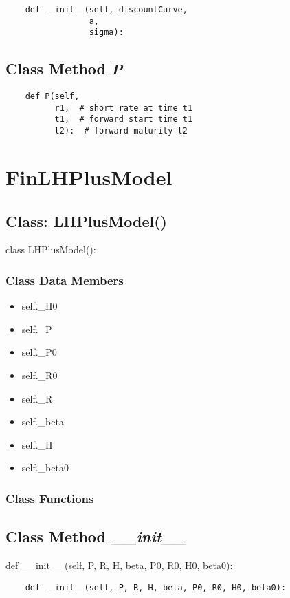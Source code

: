 \documentclass[twoside,11pt]{book}
\begin{document}
\begin{lstlisting}
    def __init__(self, discountCurve,
                 a,
                 sigma):
\end{lstlisting}

\subsection{Class Method {\it P}}


\begin{lstlisting}
    def P(self,
          r1,  # short rate at time t1
          t1,  # forward start time t1
          t2):  # forward maturity t2
\end{lstlisting}

\newpage
\section{FinLHPlusModel}

\subsection{Class: LHPlusModel()}
class LHPlusModel():

\subsubsection{Class Data Members}
\begin{itemize}
\item{self.\_H0}
\item{self.\_P}
\item{self.\_P0}
\item{self.\_R0}
\item{self.\_R}
\item{self.\_beta}
\item{self.\_H}
\item{self.\_beta0}
\end{itemize}

\subsubsection{Class Functions}

\subsection{Class Method {\it \_\_init\_\_}}
def \_\_init\_\_(self, P, R, H, beta, P0, R0, H0, beta0):

\begin{lstlisting}
    def __init__(self, P, R, H, beta, P0, R0, H0, beta0):
\end{lstlisting}
\end{document}
